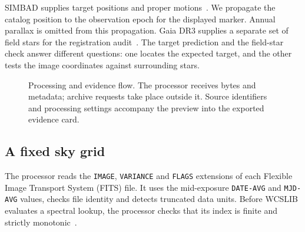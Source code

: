 \documentclass[11pt,letterpaper]{article}
\begin{document}
SIMBAD supplies target positions and proper motions~\cite{simbad}. We propagate the catalog position to the observation epoch for the displayed marker. Annual parallax is omitted from this propagation. Gaia DR3 supplies a separate set of field stars for the registration audit~\cite{gaia,registration}. The target prediction and the field-star check answer different questions: one locates the expected target, and the other tests the image coordinates against surrounding stars.

\begin{figure}[htbp]
 \centering
 \caption{Processing and evidence flow. The processor receives bytes and metadata; archive requests take place outside it. Source identifiers and processing settings accompany the preview into the exported evidence card.}
 \label{fig:pipeline}
\end{figure}

\subsection{A fixed sky grid}
The processor reads the \texttt{IMAGE}, \texttt{VARIANCE} and \texttt{FLAGS} extensions of each Flexible Image Transport System (FITS) file. It uses the mid-exposure \texttt{DATE-AVG} and \texttt{MJD-AVG} values, checks file identity and detects truncated data units. Before WCSLIB evaluates a spectral lookup, the processor checks that its index is finite and strictly monotonic~\cite{processor}.
\end{document}
